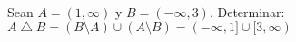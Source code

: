 \section{}

  Sean $A = (1, \infty)$  y  $B = (- \infty, 3)$. \newline
  Determinar: \newline
  $A \bigtriangleup B = (B \setminus A) \cup (A \setminus B) = (- \infty, 1] \cup [3, \infty)$
